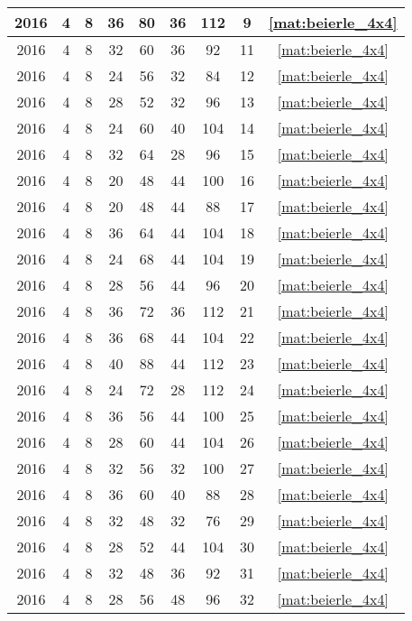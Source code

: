 \begin{longtable}{|c|c|c|c|c|c|c|c|c|}
2016 & 4 & 8 & 36 & 80 & 36 & 112 & 9 & \eqref{mat:beierle_4x4} \\ \hline 
2016 & 4 & 8 & 32 & 60 & 36 & 92 & 11 & \eqref{mat:beierle_4x4} \\ \hline 
2016 & 4 & 8 & 24 & 56 & 32 & 84 & 12 & \eqref{mat:beierle_4x4} \\ \hline 
2016 & 4 & 8 & 28 & 52 & 32 & 96 & 13 & \eqref{mat:beierle_4x4} \\ \hline 
2016 & 4 & 8 & 24 & 60 & 40 & 104 & 14 & \eqref{mat:beierle_4x4} \\ \hline 
2016 & 4 & 8 & 32 & 64 & 28 & 96 & 15 & \eqref{mat:beierle_4x4} \\ \hline 
2016 & 4 & 8 & 20 & 48 & 44 & 100 & 16 & \eqref{mat:beierle_4x4} \\ \hline 
2016 & 4 & 8 & 20 & 48 & 44 & 88 & 17 & \eqref{mat:beierle_4x4} \\ \hline 
2016 & 4 & 8 & 36 & 64 & 44 & 104 & 18 & \eqref{mat:beierle_4x4} \\ \hline 
2016 & 4 & 8 & 24 & 68 & 44 & 104 & 19 & \eqref{mat:beierle_4x4} \\ \hline 
2016 & 4 & 8 & 28 & 56 & 44 & 96 & 20 & \eqref{mat:beierle_4x4} \\ \hline 
2016 & 4 & 8 & 36 & 72 & 36 & 112 & 21 & \eqref{mat:beierle_4x4} \\ \hline 
2016 & 4 & 8 & 36 & 68 & 44 & 104 & 22 & \eqref{mat:beierle_4x4} \\ \hline 
2016 & 4 & 8 & 40 & 88 & 44 & 112 & 23 & \eqref{mat:beierle_4x4} \\ \hline 
2016 & 4 & 8 & 24 & 72 & 28 & 112 & 24 & \eqref{mat:beierle_4x4} \\ \hline 
2016 & 4 & 8 & 36 & 56 & 44 & 100 & 25 & \eqref{mat:beierle_4x4} \\ \hline 
2016 & 4 & 8 & 28 & 60 & 44 & 104 & 26 & \eqref{mat:beierle_4x4} \\ \hline 
2016 & 4 & 8 & 32 & 56 & 32 & 100 & 27 & \eqref{mat:beierle_4x4} \\ \hline 
2016 & 4 & 8 & 36 & 60 & 40 & 88 & 28 & \eqref{mat:beierle_4x4} \\ \hline 
2016 & 4 & 8 & 32 & 48 & 32 & 76 & 29 & \eqref{mat:beierle_4x4} \\ \hline 
2016 & 4 & 8 & 28 & 52 & 44 & 104 & 30 & \eqref{mat:beierle_4x4} \\ \hline 
2016 & 4 & 8 & 32 & 48 & 36 & 92 & 31 & \eqref{mat:beierle_4x4} \\ \hline 
2016 & 4 & 8 & 28 & 56 & 48 & 96 & 32 & \eqref{mat:beierle_4x4} \\ \hline 

\end{longtable}

